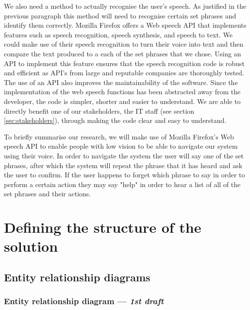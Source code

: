 We also need a method to actually recognise the user's speech.
As justified in the previous paragraph this method will need
to recognise certain set phrases and identify them correctly.
Mozilla Firefox offers a Web speech API that implements
features such as speech recognition, speech synthesis, and
speech to text. We could make use of their speech recognition
to turn their voice into text and then compare the text
produced to a each of the set phrases that we chose. Using an
API to implement this feature ensures that the speech recognition
code is robust and efficient as API's from large and reputable
companies are thoroughly tested. The use of an API also
improves the maintainability of the software. Since the
implementation of the web speech functions has been abstracted
away from the developer, the code is simpler, shorter and easier
to understand. We are able to directly benefit one of our
stakeholders, the IT staff (see section \ref{sec:stakeholders}),
through making the code clear and easy to understand.\\ \vspace{0.2cm}

To briefly summarise our research, we will make use of Mozilla
Firefox's Web speech API to enable people with low vision to be
able to navigate our system using their voice. In order to navigate
the system the user will say one of the set phrases, after which the
system will repeat the phrase that it has heard and ask the user
to confirm. If the user happens to forget which phrase to say in
order to perform a certain action they may say "help" in order to
hear a list of all of the set phrases and their actions.

\section{Defining the structure of the solution}

\subsection{Entity relationship diagrams}

\subsubsection{Entity relationship diagram — \textit{1st draft}}
\label{sec:erdd}


